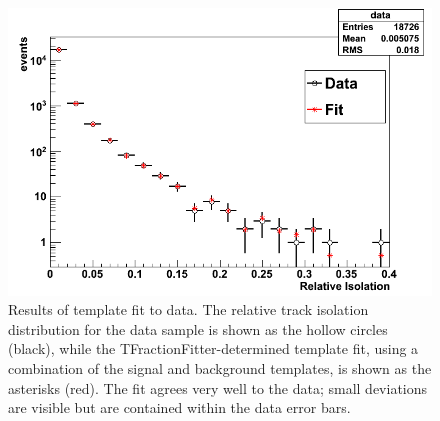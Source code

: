  \begin{figure}[htb]
  \begin{center}
    \includegraphics[width=360pt]{Figures/TFractionFitter-full-01Mar11.png}
  \end{center}
  \caption[Results of template fit to data]{
    Results of template fit to data.
    The relative track isolation distribution 
    for the data sample 
    is shown as the hollow circles (black), 
    while the TFractionFitter-determined 
    template fit, 
    using a combination of the signal 
    and background templates, 
    is shown as the asterisks (red).  
    The fit agrees very well to the data; 
    small deviations are visible but 
    are contained within the data error bars.  
  }
  \label{fig:TFractionFit}
 \end{figure}

